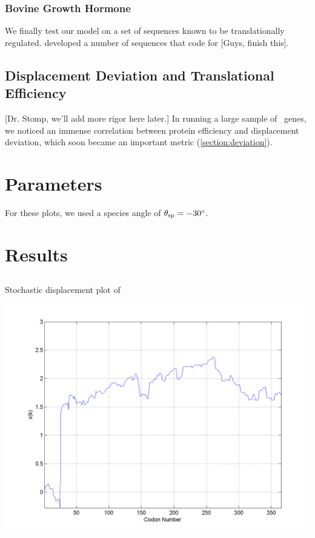 \documentclass[12pt]{article}
\numberwithin{equation}{section}
\begin{document}
\subsubsection{Bovine Growth Hormone}
We finally test our model on a set of sequences known to be translationally 
regulated.  \citet{schoner:bgh} developed a number of sequences that
code for [Guys, finish this].

\subsection{Displacement Deviation and Translational Efficiency}
[Dr. Stomp, we'll add more rigor here later.] In running a large
sample of \ecoli\ genes, we noticed an immense correlation between
protein efficiency and displacement deviation, which soon became an
important metric (\autoref{section:deviation}).

\section{Parameters}
\label{section:parameters}
For these plots, we used a species angle of $\theta_{\rm{sp}}
=-30^\circ$.

\section{Results}
\subsection{\prfB}

\begin{cfigure}
  \caption{Stochastic displacement plot of \prfB}
  \label{prfB}
  \includegraphics[scale=0.4]{prfB/disp}
\end{cfigure}
\end{document}
